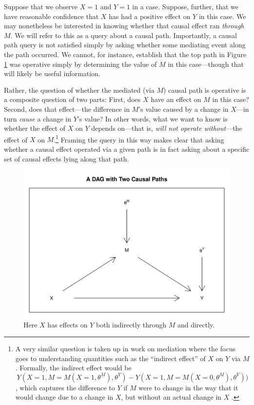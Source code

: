 \documentclass[
  12pt,
]{book}
\begin{document}
Suppose that we observe \(X=1\) and \(Y=1\) in a case. Suppose, further, that we have reasonable confidence that \(X\) has had a positive effect on \(Y\) in this case. We may nonetheless be interested in knowing whether that causal effect ran \emph{through} \(M\). We will refer to this as a query about a causal path. Importantly, a causal path query is not satisfied simply by asking whether some mediating event along the path occurred. We cannot, for instance, establish that the top path in Figure \ref{fig:DAGpaths} was operative simply by determining the value of \(M\) in this case---though that will likely be useful information.

Rather, the question of whether the mediated (via \(M\)) causal path is operative is a composite question of two parts: First, does \(X\) have an effect on \(M\) in this case? Second, does that effect---the difference in \(M\)'s value caused by a change in \(X\)---in turn \emph{cause} a change in \(Y\)'s value? In other words, what we want to know is whether the effect of \(X\) on \(Y\) depends on---that is, \emph{will not operate without}---the effect of \(X\) on \(M\).\footnote{A very similar question is taken up in work on mediation where the focus goes to understanding quantities such as the ``indirect effect'' of \(X\) on \(Y\) via \(M\). Formally, the indirect effect would be \[Y(X=1, M = M(X=1,\theta^M), 
  \theta^Y) - Y(X = 1, M = M(X=0, \theta^M), \theta^Y))\], which captures the difference to \(Y\) if \(M\) were to change in the way that it would change due to a change in \(X\), but without an actual change in \(X\) \citep[ p 132, \citet{imai2010general}]{pearl2009causality}.} Framing the query in this way makes clear that asking whether a causal effect operated via a given path is in fact asking about a specific set of causal effects lying along that path.

\begin{figure}

{\centering \includegraphics[width=0.6\linewidth]{ii_files/figure-latex/DAGpaths-1} 

}

\caption{Here $X$ has effects on $Y$ both indirectly through $M$ and directly.}\label{fig:DAGpaths}
\end{figure}
\end{document}
